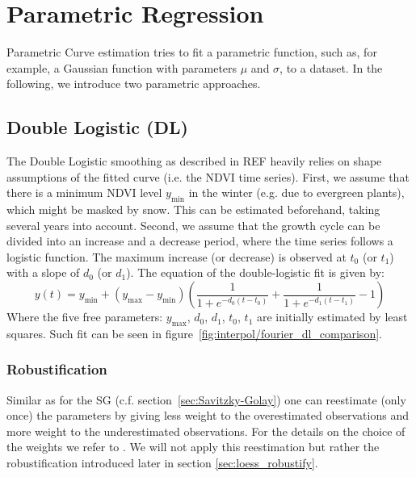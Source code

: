 
\section{Parametric Regression} 
	\label{sec:itpl_parametric}
	Parametric Curve estimation tries to fit a parametric function, such as, for example, a Gaussian function with parameters $\mu$ and $\sigma$, to a dataset. In the following, we introduce two parametric approaches.

	\subsection{Double Logistic (DL)}
		\label{sec:double_logistic}
		The Double Logistic smoothing as described in \cite{beckImprovedMonitoringVegetation2006}REF heavily relies on shape assumptions of the fitted curve (i.e. the NDVI time series). First, we assume that there  is a minimum NDVI level $y_{\min}$ in the winter (e.g. due to evergreen plants), which might be masked by snow. This can be estimated beforehand, taking several years into account. Second, we assume that the growth cycle can be divided into an increase and a decrease period, where the time series follows a logistic function. The maximum increase (or decrease) is observed at $t_0$ (or $t_1$) with a slope of $d_0$ (or $d_1$). The equation of the double-logistic fit is given by:
		\begin{equation*}
			y(t) = y_{\min} + \left(y_{\max}-y_{\min}\right)\left(\frac{1}{1+e^{-d_0(t-t_0)}}+\frac{1}{1+e^{-d_1(t-t_1)}}-1\right)
		\end{equation*}
		Where the five free parameters: $y_{\max}$, $d_0$, $d_1$, $t_0$, $t_1$ are initially estimated by least squares. Such fit can be seen in figure~\ref{fig:interpol/fourier_dl_comparison}.

		\subsubsection*{Robustification}
		Similar as for the SG (c.f. section~\ref{sec:Savitzky-Golay}) one can reestimate (only once) the parameters by giving less weight to the overestimated observations and more weight to the underestimated observations. For the details on the choice of the weights we refer to \cite{beckImprovedMonitoringVegetation2006}. We will not apply this reestimation but rather the robustification introduced later in section \ref{sec:loess_robustify}.


